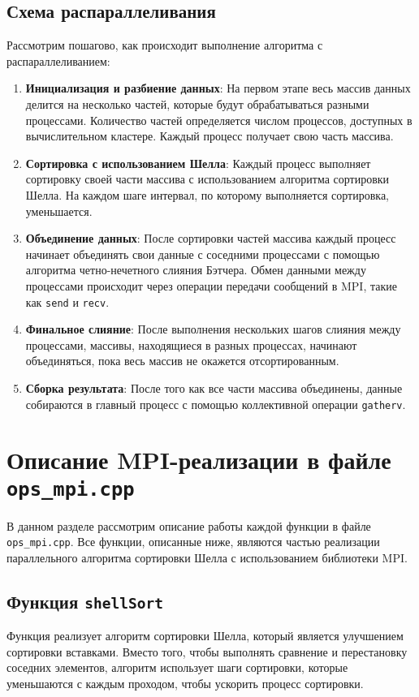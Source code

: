\documentclass[a4paper,12pt]{article}
\begin{document}
\subsection{Схема распараллеливания}
Рассмотрим пошагово, как происходит выполнение алгоритма с распараллеливанием:

\begin{enumerate}
    \item \textbf{Инициализация и разбиение данных}: На первом этапе весь массив данных делится на несколько частей, которые будут обрабатываться разными процессами. Количество частей определяется числом процессов, доступных в вычислительном кластере. Каждый процесс получает свою часть массива.
    
    \item \textbf{Сортировка с использованием Шелла}: Каждый процесс выполняет сортировку своей части массива с использованием алгоритма сортировки Шелла. На каждом шаге интервал, по которому выполняется сортировка, уменьшается.
    
    \item \textbf{Объединение данных}: После сортировки частей массива каждый процесс начинает объединять свои данные с соседними процессами с помощью алгоритма четно-нечетного слияния Бэтчера. Обмен данными между процессами происходит через операции передачи сообщений в MPI, такие как \texttt{send} и \texttt{recv}.
    
    \item \textbf{Финальное слияние}: После выполнения нескольких шагов слияния между процессами, массивы, находящиеся в разных процессах, начинают объединяться, пока весь массив не окажется отсортированным.
    
    \item \textbf{Сборка результата}: После того как все части массива объединены, данные собираются в главный процесс с помощью коллективной операции \texttt{gatherv}.
\end{enumerate}


\section{Описание MPI-реализации в файле \texttt{ops\_mpi.cpp}}

В данном разделе рассмотрим описание работы каждой функции в файле \texttt{ops\_mpi.cpp}. Все функции, описанные ниже, являются частью реализации параллельного алгоритма сортировки Шелла с использованием библиотеки MPI.

\subsection{Функция \texttt{shellSort}}
Функция реализует алгоритм сортировки Шелла, который является улучшением сортировки вставками. Вместо того, чтобы выполнять сравнение и перестановку соседних элементов, алгоритм использует шаги сортировки, которые уменьшаются с каждым проходом, чтобы ускорить процесс сортировки.
\end{document}
